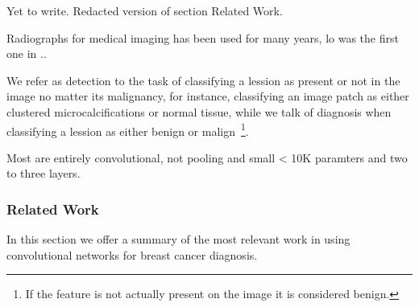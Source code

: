 Yet to write. Redacted version of section Related Work.

Radiographs for medical imaging has been used for many years, lo was the first one in ..

We refer as detection to the task of classifying a lession as present or not in the image no matter its malignancy, for instance, classifying an image patch as either clustered microcalcifications or normal tissue, while we talk of diagnosis when classifying a lession as either benign or malign~\footnote{If the feature is not actually present on the image it is considered benign.}.

Most are entirely convolutional, not pooling and small < 10K paramters and two to three layers.
\subsubsection{Related Work}
In this section we offer a summary of the most relevant work in using convolutional networks for breast cancer diagnosis. %


